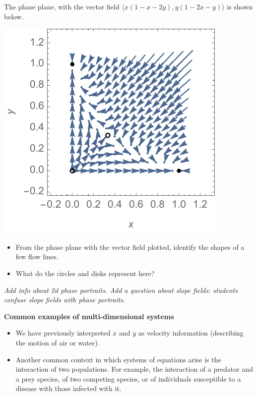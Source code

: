 \documentclass[12pt,letterpaper,noanswers]{exam}
\begin{document}
    The phase plane, with the vector field $\langle x(1-x-2y), y(1-2x-y)\rangle$ is shown below.
    
    \includegraphics{img/C34phase2.pdf}
    
    \begin{itemize}
        \item From the phase plane with the vector field plotted, identify the shapes of a few flow lines.
        \vspace{1in}
        
        \item What do the circles and disks represent here?
    \end{itemize}
    
    \vspace{1.5in}
    
    \emph{Add info about 2d phase portraits.  Add a question about slope fields: students confuse slope fields with phase portraits.}
    
    
    \noindent\textbf{Common examples of multi-dimensional systems}
    \begin{tcolorbox}
    \begin{itemize}
    \itemsep0em
    \item We have previously interpreted $\dot x$ and $\dot y$ as velocity information (describing the motion of air or water).
    \item Another common context in which systems of equations arise is the interaction of two populations.  For example, the interaction of a predator and a prey species, of two competing species, or of individuals susceptible to a disease with those infected with it.
    \end{itemize}
\end{tcolorbox}
\eject
\end{document}
